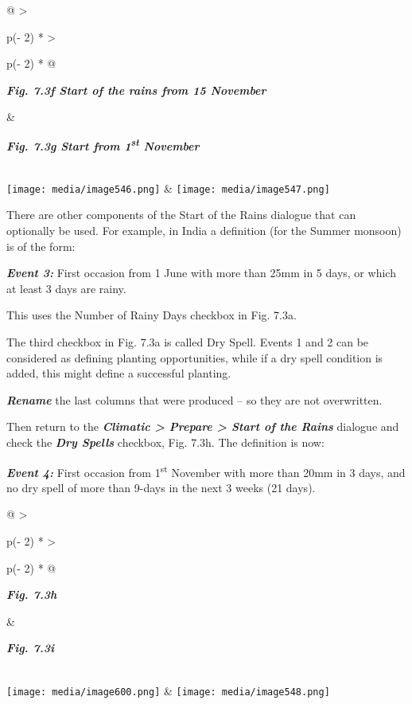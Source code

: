 \documentclass[
  letterpaper,
  DIV=11,
  numbers=noendperiod]{scrreprt}
\begin{document}
\begin{longtable}[]{@{}
  >{\raggedright\arraybackslash}p{(\columnwidth - 2\tabcolsep) * }
  >{\raggedright\arraybackslash}p{(\columnwidth - 2\tabcolsep) * }@{}}
\toprule\noalign{}
\begin{minipage}[b]{\linewidth}\raggedright
\textbf{\emph{Fig. 7.3f Start of the rains from 15 November}}
\end{minipage} & \begin{minipage}[b]{\linewidth}\raggedright
\textbf{\emph{Fig. 7.3g Start from 1\textsuperscript{st} November}}
\end{minipage} \\
\midrule\noalign{}
\endhead
\bottomrule\noalign{}
\endlastfoot
\texttt{[image: media/image546.png]} &
\texttt{[image: media/image547.png]} \\
\end{longtable}

There are other components of the Start of the Rains dialogue that can
optionally be used. For example, in India a definition (for the Summer
monsoon) is of the form:

\textbf{\emph{Event 3:}} First occasion from 1 June with more than 25mm
in 5 days, or which at least 3 days are rainy.

This uses the Number of Rainy Days checkbox in Fig. 7.3a.

The third checkbox in Fig. 7.3a is called Dry Spell. Events 1 and 2 can
be considered as defining planting opportunities, while if a dry spell
condition is added, this might define a successful planting.

\textbf{\emph{Rename}} the last columns that were produced -- so they
are not overwritten.

Then return to the \textbf{\emph{Climatic \textgreater{} Prepare
\textgreater{} Start of the Rains}} dialogue and check the
\textbf{\emph{Dry Spells}} checkbox, Fig. 7.3h. The definition is now:

\textbf{\emph{Event 4:}} First occasion from 1\textsuperscript{st}
November with more than 20mm in 3 days, and no dry spell of more than
9-days in the next 3 weeks (21 days).

\begin{longtable}[]{@{}
  >{\raggedright\arraybackslash}p{(\columnwidth - 2\tabcolsep) * }
  >{\raggedright\arraybackslash}p{(\columnwidth - 2\tabcolsep) * }@{}}
\toprule\noalign{}
\begin{minipage}[b]{\linewidth}\raggedright
\textbf{\emph{Fig. 7.3h}}
\end{minipage} & \begin{minipage}[b]{\linewidth}\raggedright
\textbf{\emph{Fig. 7.3i}}
\end{minipage} \\
\midrule\noalign{}
\endhead
\bottomrule\noalign{}
\endlastfoot
\texttt{[image: media/image600.png]} &
\texttt{[image: media/image548.png]} \\
\end{longtable}
\end{document}
